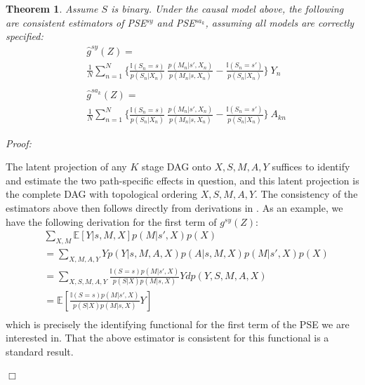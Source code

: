 \documentclass[letterpaper]{article} %
\newtheorem{thm}{Theorem}
\newcommand{\E}{\mathbb{E}}
\newenvironment{prf}{\noindent\textit{Proof:}\begin{mdseries}}{\end{mdseries}{\hfill\scriptsize$\Box$}}
\begin{document}
\begin{thm}%
	Assume $S$ is binary. Under the causal model above, the following are consistent estimators of PSE$^{sy}$ and PSE$^{sa_k}$, assuming all models are correctly specified:
	{\small
		\begin{align}
			&\widehat{g}^{sy}(Z) = \\ \nonumber 
			&\frac{1}{N} \sum_{n=1}^{N} \Big\{ \frac{\mathbb{I}(S_n = s)}{p(S_n | X_n)} \ \frac{p(M_{n} | s', X_n)}{p(M_{n} | s, X_n)}
			- \frac{\mathbb{I}(S_n = s')}{p(S_n | X_n)} \Big\} \ Y_n \\ \nonumber \\
			&\widehat{g}^{s{a}_k}(Z) =\\ \nonumber 
			&\frac{1}{N} \sum_{n=1}^{N} \Big\{ \frac{\mathbb{I}(S_n = s)}{p(S_n | X_n)} \ \frac{p(M_{n} | s', X_n)}{p(M_{n} | s, X_n)}
			- \frac{\mathbb{I}(S_n = s')}{p(S_n | X_n)} \Big\} \ A_{kn}
		\end{align}
	}%
\end{thm}
\begin{prf}
	The latent projection \cite{verma90equiv} of any $K$ stage DAG onto $X,S,M,A,Y$ suffices to identify and estimate the two path-specific effects in question, and this latent projection is the complete DAG with topological ordering $X,S,M,A,Y$.
	The consistency of the estimators above then follows directly from derivations in \cite{tchetgen12semi}.
	As an example, we have the following derivation for the first term of $g^{sy}(Z)$:
{\small
	\begin{align*}
	&
	\sum_{X,M} \E\left[
	Y| s, M, X
	\right]p(M|s',X)p(X)\\
	&= \sum_{X,M,A,Y} Y p(Y | s,M,A,X) p(A | s,M,X) p(M | s',X) p(X)\\
	&=
	\sum_{X,S,M,A,Y} \frac{\mathbb{I}(S = s)p(M | s', X)}{p(S | X) p(M | s, X)} Y %
	dp(Y,S,M,A,X)\\
	&= \E\left[
	\frac{\mathbb{I}(S = s)p(M | s', X)}{p(S | X) p(M | s, X)} Y %
	\right]\\
	\end{align*}
}%
	which is precisely the identifying functional for the first term of the PSE we are interested in. That the above estimator is consistent for this functional is a standard result.
\end{prf}
\end{document}
